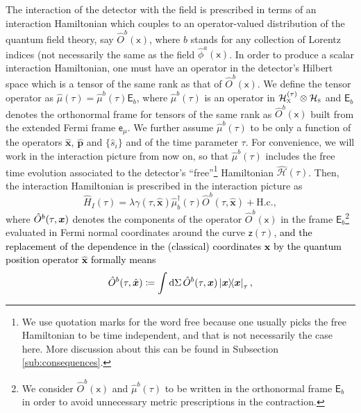 \documentclass[prd,twocolumn,superscriptaddress,floatfix,amsmath,amssymb,amsfonts,longbibliography,nofootinbib]{revtex4-1}
\newcommand{\mf}{\mathsf}%
\newcommand{\tb}[1]{\textcolor{black}{#1}}
\begin{document}
The interaction of the detector with the field is prescribed in terms of an interaction Hamiltonian which couples to an operator-valued distribution of the quantum field theory, say $\hat{O}^b(\mf x)$, where $b$ stands for any collection of Lorentz indices (not necessarily the same as the field $\hat{\phi}^a(\mf x)$. In order to produce a scalar interaction Hamiltonian, one must have an operator in the detector's Hilbert space which is a tensor of the same rank as that of $\hat{O}^b(\mf x)$. We define the tensor operator as $\hat{\mu}(\tau) = \hat{\mu}^b(\tau)\mf{E}_b$, where $\hat{\mu}^b(\tau)$ is an operator in $\mathcal{H}_\textsc{x}^{(\tau)}\otimes\mathcal{H}_\textsc{s}$ and $\mf E_b$ denotes the orthonormal frame for tensors of the same rank as $\hat{O}^b(\mf x)$ built from the extended Fermi frame $\mf e_\mu$. We further assume $\hat{\mu}^b(\tau)$ to be only a function of the operators $\hat{\bm x}$, $\hat{\bm p}$ and $\{\hat{s}_i\}$ and of the time parameter $\tau$. For convenience, we will work in the interaction picture from now on, so that $\hat{\mu}^b(\tau)$ includes the free time evolution associated to the detector's ``free''\footnote{We use quotation marks for the word free because one usually picks the free Hamiltonian to be time independent, and that is not necessarily the case here. More discussion about this can be found in Subsection \ref{sub:consequences}.} Hamiltonian $\hat{\mathcal{H}}(\tau)$. Then, the interaction Hamiltonian is prescribed in the interaction picture as
\begin{equation}\label{eq:generalPD}
    \hat{H}_I(\tau) = \lambda \gamma(\tau,\hat{\bm x})\hat{\mu}^\dagger_b(\tau)\hat{O}^b(\tau,\hat{\bm x}) + \text{H.c.},
\end{equation}
where $\hat{O}^b(\tau,\tb{\bm x})$ denote\tb{s} the components of the operator $\hat{O}^b(\mf x)$ in the frame $\mf{E}_b$\footnote{We consider $\hat{O}^b(\mf x)$ and $\hat{\mu}^b(\tau)$ to be written in the orthonormal frame $\mf E_b$ in order to avoid unnecessary metric prescriptions in the contraction.} evaluated in Fermi normal coordinates around the curve $\mf z(\tau)$, \tb{ and the replacement of the dependence in the (classical) coordinates $\bm x$ by the quantum position operator $\hat{\bm x}$ formally means} 
\begin{equation}
    \tb{\hat{O}^b(\tau,\hat{\bm x}) \coloneqq  \int
\dd\Sigma \,\hat{O}^b (\tau , \bm{x}) \ket{\bm{x}}\!\!\bra{\bm{x}}_{\tau},}
\end{equation}
\end{document}
